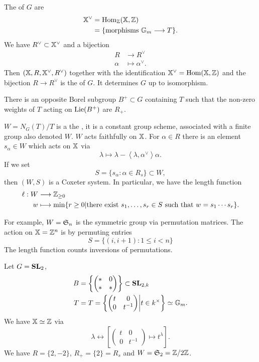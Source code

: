 	The  of $G$ are
	\begin{align*}
		\XX^{\vee} &= \Hom_\Z(\XX,\Z) \\
		&= \{\text{morphisms }\Gm\to T\} .
	\end{align*}
	We have  $R^{\vee}\subset \XX^{\vee}$ and a bijection
	\begin{align*}
		R &\longrightarrow R^{\vee} \\
		\alpha &\longmapsto \alpha ^{\vee}.
	\end{align*}
	Then $(\XX,R,\XX^{\vee},R^{\vee})$ together with the identification
	$\XX^{\vee}=\Hom(\XX,\Z)$ and the bijection $R\to R^{\vee}$ is the  of
	$G$. It determines $G$ up to isomorphism.

	There is an opposite Borel subgroup $B^{+}\subset G$ containing $T$ such that the
	non-zero weights of $T$ acting on $\Lie(B^{+})$ are $R_+$.

	$W=N_G(T) / T$ is a the , it is a constant group scheme, associated
	with a finite group also denoted $W$. $W$ acts faithfully on $\XX$. For $\alpha\in R$
	there is an element $s_\alpha\in W$ which acts on $\XX$ via
	\[
		\lambda \mapsto \lambda - \left<\lambda,\alpha ^{\vee} \right>\alpha.
	\]
	If we set
	\[
		S = \{s_\alpha : \alpha\in R_s\} \subset W,
	\]
	then $(W,S)$ is a Coxeter system. In particular, we have the length function
	\begin{align*}
		\ell: W &\longrightarrow \Z_{\ge 0} \\
		w &\longmapsto \min \{r\ge 0 | \text{there exist }s_1,\dots,s_r\in S\text{ such that
		}w=s_1\cdots s_r\} .	
	\end{align*}
	\begin{example}
		For example, $W=\S_n$ is the symmetric group via permutation matrices. The action on
		$\XX=\Z^{n}$ is by permuting entries
		\[
			S = \{(i,i+1):1\le i<n\}
		\]
		The length function counts inversions of permutations.
	\end{example}
	\begin{example}
		Let $G=\SL_2$,
		\begin{align*}
			B &= \left\{
				\begin{pmatrix} * & 0 \\ * & *
			\end{pmatrix}  \right\} \subset \SL_{2,k} \\
			T &= T = \left\{
				\begin{pmatrix} t & 0 \\ 0 & t^{-1}
			\end{pmatrix} \middle| t\in k^{\times } \right\} \isoto \Gm.
		\end{align*}
		We have $\XX\isoto \Z$ via
		\[
			\lambda \leftrightarrow \left[
				\begin{pmatrix} t & 0 \\ 0 & t^{-1}
			\end{pmatrix} \mapsto t ^{\lambda} \right] .
		\]
		We have $R=\{2,-2\} $, $R_+=\{2\} =R_s$ and $W=\S_2=\Z /2\Z$.
	\end{example}


